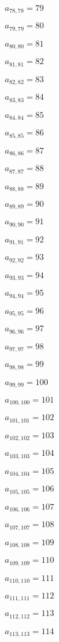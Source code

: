 \documentclass[a4paper,12pt]{article}
\begin{document}
$a _{ 78, 78 } = 79$

$a _{ 79, 79 } = 80$

$a _{ 80, 80 } = 81$

$a _{ 81, 81 } = 82$

$a _{ 82, 82 } = 83$

$a _{ 83, 83 } = 84$

$a _{ 84, 84 } = 85$

$a _{ 85, 85 } = 86$

$a _{ 86, 86 } = 87$

$a _{ 87, 87 } = 88$

$a _{ 88, 88 } = 89$

$a _{ 89, 89 } = 90$

$a _{ 90, 90 } = 91$

$a _{ 91, 91 } = 92$

$a _{ 92, 92 } = 93$

$a _{ 93, 93 } = 94$

$a _{ 94, 94 } = 95$

$a _{ 95, 95 } = 96$

$a _{ 96, 96 } = 97$

$a _{ 97, 97 } = 98$

$a _{ 98, 98 } = 99$

$a _{ 99, 99 } = 100$

$a _{ 100, 100 } = 101$

$a _{ 101, 101 } = 102$

$a _{ 102, 102 } = 103$

$a _{ 103, 103 } = 104$

$a _{ 104, 104 } = 105$

$a _{ 105, 105 } = 106$

$a _{ 106, 106 } = 107$

$a _{ 107, 107 } = 108$

$a _{ 108, 108 } = 109$

$a _{ 109, 109 } = 110$

$a _{ 110, 110 } = 111$

$a _{ 111, 111 } = 112$

$a _{ 112, 112 } = 113$

$a _{ 113, 113 } = 114$
\end{document}
